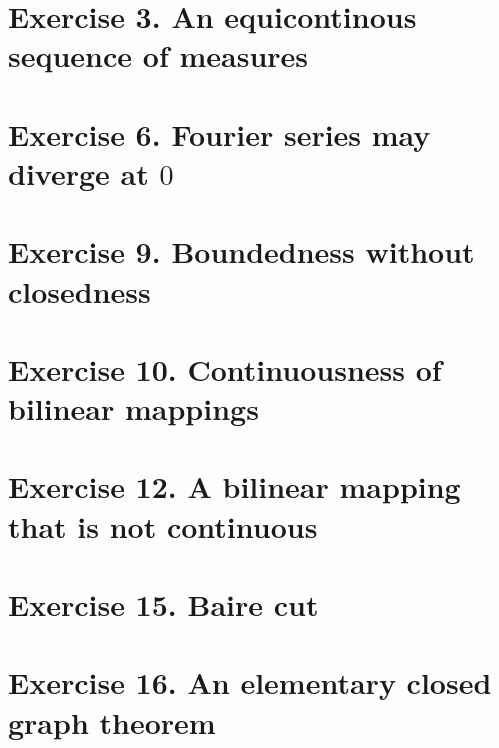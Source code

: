 \section{Exercise 3. An equicontinous sequence of measures}

\section{Exercise 6. Fourier series may diverge at $0$}

\section{Exercise 9. Boundedness without closedness}

\newpage
\section{Exercise 10. Continuousness of bilinear mappings}

\newpage
\section{Exercise 12. A bilinear mapping that is not continuous}

\newpage
\section{Exercise 15. Baire cut}

\newpage
\section{Exercise 16. An elementary closed graph theorem}
